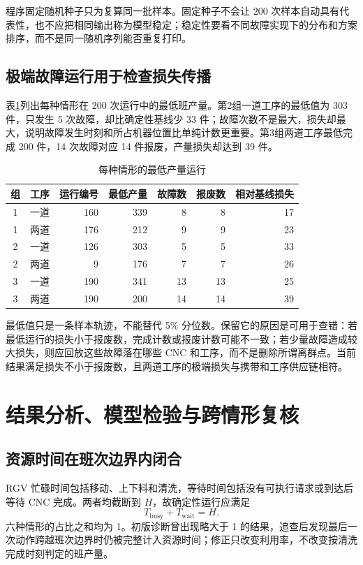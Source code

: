 \documentclass[UTF8,11pt,a4paper]{ctexart}
\begin{document}
程序固定随机种子只为复算同一批样本。固定种子不会让 200 次样本自动具有代表性，也不应把相同输出称为模型稳定；稳定性要看不同故障实现下的分布和方案排序，而不是同一随机序列能否重复打印。

\subsection{极端故障运行用于检查损失传播}

表\ref{tab:worst-failure-b}列出每种情形在 200 次运行中的最低班产量。第2组一道工序的最低值为 303 件，只发生 5 次故障，却比确定性基线少 33 件；故障次数不是最大，损失却最大，说明故障发生时刻和所占机器位置比单纯计数更重要。第3组两道工序最低完成 200 件，14 次故障对应 14 件报废，产量损失却达到 39 件。

\begin{table}[H]
\centering
\caption{每种情形的最低产量运行}
\label{tab:worst-failure-b}
\small
\begin{tabular}{ccrrrrr}
\toprule
组 & 工序 & 运行编号 & 最低产量 & 故障数 & 报废数 & 相对基线损失\\
\midrule
1 & 一道 & 160 & 339 & 8 & 8 & 17\\
1 & 两道 & 176 & 212 & 9 & 9 & 23\\
2 & 一道 & 126 & 303 & 5 & 5 & 33\\
2 & 两道 & 9 & 176 & 7 & 7 & 26\\
3 & 一道 & 190 & 341 & 13 & 13 & 25\\
3 & 两道 & 190 & 200 & 14 & 14 & 39\\
\bottomrule
\end{tabular}
\end{table}

最低值只是一条样本轨迹，不能替代 5\% 分位数。保留它的原因是可用于查错：若最低运行的损失小于报废数，完成计数或报废计数可能不一致；若少量故障造成较大损失，则应回放这些故障落在哪些 CNC 和工序，而不是删除所谓离群点。当前结果满足损失不小于报废数，且两道工序的极端损失与携带和工序供应链相符。

\section{结果分析、模型检验与跨情形复核}

\subsection{资源时间在班次边界内闭合}

RGV 忙碌时间包括移动、上下料和清洗，等待时间包括没有可执行请求或到达后等待 CNC 完成。两者均截断到 $H$，故确定性运行应满足
\begin{equation}
T_{\mathrm{busy}}+T_{\mathrm{wait}}=H.
\label{eq:time-closure-b}
\end{equation}
六种情形的占比之和均为 1。初版诊断曾出现略大于 1 的结果，追查后发现最后一次动作跨越班次边界时仍被完整计入资源时间；修正只改变利用率，不改变按清洗完成时刻判定的班产量。
\end{document}
